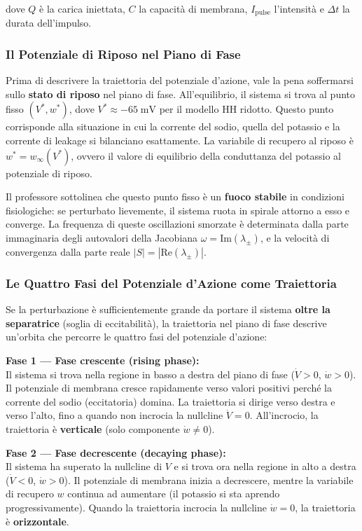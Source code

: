 dove $Q$ è la carica iniettata, $C$ la capacità di membrana, $I_{\text{pulse}}$ l'intensità e $\Delta t$ la durata dell'impulso.

\subsubsection{Il Potenziale di Riposo nel Piano di Fase}

Prima di descrivere la traiettoria del potenziale d'azione, vale la pena soffermarsi sullo \textbf{stato di riposo} nel piano di fase. All'equilibrio, il sistema si trova al punto fisso $(V^*, w^*)$, dove $V^* \approx -65 \; \text{mV}$ per il modello HH ridotto. Questo punto corrisponde alla situazione in cui la corrente del sodio, quella del potassio e la corrente di leakage si bilanciano esattamente. La variabile di recupero al riposo è $w^* = w_\infty(V^*)$, ovvero il valore di equilibrio della conduttanza del potassio al potenziale di riposo.

Il professore sottolinea che questo punto fisso è un \textbf{fuoco stabile} in condizioni fisiologiche: se perturbato lievemente, il sistema ruota in spirale attorno a esso e converge. La frequenza di queste oscillazioni smorzate è determinata dalla parte immaginaria degli autovalori della Jacobiana $\omega = \text{Im}(\lambda_\pm)$, e la velocità di convergenza dalla parte reale $|S| = |\text{Re}(\lambda_\pm)|$.

\subsubsection{Le Quattro Fasi del Potenziale d'Azione come Traiettoria}

Se la perturbazione è sufficientemente grande da portare il sistema \textbf{oltre la separatrice} (soglia di eccitabilità), la traiettoria nel piano di fase descrive un'orbita che percorre le quattro fasi del potenziale d'azione:

\textbf{Fase 1 — Fase crescente (rising phase):}\\
Il sistema si trova nella regione in basso a destra del piano di fase ($\dot{V} > 0$, $\dot{w} > 0$). Il potenziale di membrana cresce rapidamente verso valori positivi perché la corrente del sodio (eccitatoria) domina. La traiettoria si dirige verso destra e verso l'alto, fino a quando non incrocia la nullcline $\dot{V} = 0$. All'incrocio, la traiettoria è \textbf{verticale} (solo componente $\dot{w} \neq 0$).

\textbf{Fase 2 — Fase decrescente (decaying phase):}\\
Il sistema ha superato la nullcline di $V$ e si trova ora nella regione in alto a destra ($\dot{V} < 0$, $\dot{w} > 0$). Il potenziale di membrana inizia a decrescere, mentre la variabile di recupero $w$ continua ad aumentare (il potassio si sta aprendo progressivamente). Quando la traiettoria incrocia la nullcline $\dot{w} = 0$, la traiettoria è \textbf{orizzontale}.

